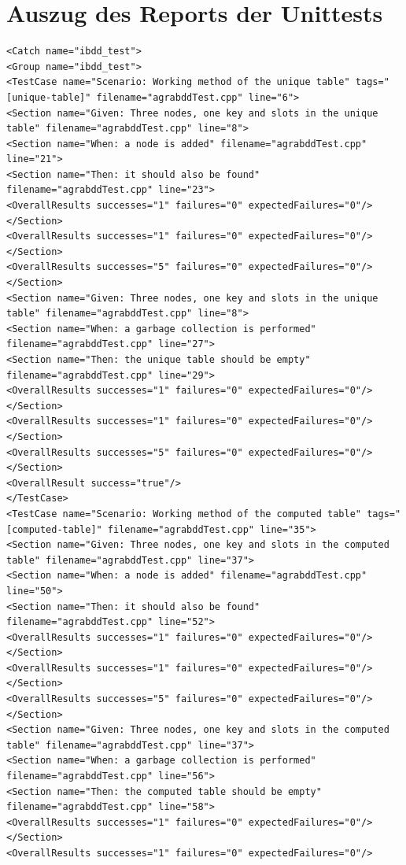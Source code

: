 \section*{Auszug des Reports der Unittests}
\label{sec:unit}
\tiny
\begin{verbatim}
<Catch name="ibdd_test">
<Group name="ibdd_test">
<TestCase name="Scenario: Working method of the unique table" tags="[unique-table]" filename="agrabddTest.cpp" line="6">
<Section name="Given: Three nodes, one key and slots in the unique table" filename="agrabddTest.cpp" line="8">
<Section name="When: a node is added" filename="agrabddTest.cpp" line="21">
<Section name="Then: it should also be found" filename="agrabddTest.cpp" line="23">
<OverallResults successes="1" failures="0" expectedFailures="0"/>
</Section>
<OverallResults successes="1" failures="0" expectedFailures="0"/>
</Section>
<OverallResults successes="5" failures="0" expectedFailures="0"/>
</Section>
<Section name="Given: Three nodes, one key and slots in the unique table" filename="agrabddTest.cpp" line="8">
<Section name="When: a garbage collection is performed" filename="agrabddTest.cpp" line="27">
<Section name="Then: the unique table should be empty" filename="agrabddTest.cpp" line="29">
<OverallResults successes="1" failures="0" expectedFailures="0"/>
</Section>
<OverallResults successes="1" failures="0" expectedFailures="0"/>
</Section>
<OverallResults successes="5" failures="0" expectedFailures="0"/>
</Section>
<OverallResult success="true"/>
</TestCase>
<TestCase name="Scenario: Working method of the computed table" tags="[computed-table]" filename="agrabddTest.cpp" line="35">
<Section name="Given: Three nodes, one key and slots in the computed table" filename="agrabddTest.cpp" line="37">
<Section name="When: a node is added" filename="agrabddTest.cpp" line="50">
<Section name="Then: it should also be found" filename="agrabddTest.cpp" line="52">
<OverallResults successes="1" failures="0" expectedFailures="0"/>
</Section>
<OverallResults successes="1" failures="0" expectedFailures="0"/>
</Section>
<OverallResults successes="5" failures="0" expectedFailures="0"/>
</Section>
<Section name="Given: Three nodes, one key and slots in the computed table" filename="agrabddTest.cpp" line="37">
<Section name="When: a garbage collection is performed" filename="agrabddTest.cpp" line="56">
<Section name="Then: the computed table should be empty" filename="agrabddTest.cpp" line="58">
<OverallResults successes="1" failures="0" expectedFailures="0"/>
</Section>
<OverallResults successes="1" failures="0" expectedFailures="0"/>

\end{verbatim}
